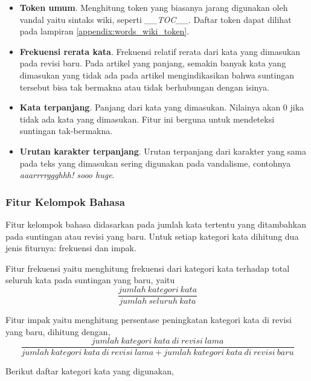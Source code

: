 \begin{itemize}
\item \textbf{Token umum}.
Menghitung token yang biasanya jarang digunakan oleh vandal yaitu sintaks
wiki, seperti \textit{\_\_TOC\_\_}. Daftar token dapat dilihat pada lampiran
\ref{appendix:words_wiki_token}.

\item \textbf{Frekuensi rerata kata}.
Frekuensi relatif rerata dari kata yang dimasukan pada revisi baru.
Pada artikel yang panjang, semakin banyak kata yang dimasukan yang tidak ada
pada artikel mengindikasikan bahwa suntingan tersebut bisa tak bermakna atau
tidak berhubungan dengan isinya.

\item \textbf{Kata terpanjang}.
Panjang dari kata yang dimasukan.
Nilainya akan 0 jika tidak ada kata yang dimasukan.
Fitur ini berguna untuk mendeteksi suntingan tak-bermakna.

\item \textbf{Urutan karakter terpanjang}.
Urutan terpanjang dari karakter yang sama pada teks yang dimasukan sering
digunakan pada vandalisme, contohnya \textit{aaarrrrggghhh! sooo huge}.

\end{itemize}

\subsubsection{Fitur Kelompok Bahasa}

Fitur kelompok bahasa didasarkan pada jumlah kata tertentu yang ditambahkan
pada suntingan atau revisi yang baru.
Untuk setiap kategori kata dihitung dua jenis fiturnya: frekuensi dan impak.

Fitur frekuensi yaitu menghitung frekuensi dari kategori kata terhadap
total seluruh kata pada suntingan yang baru, yaitu
\[
	\frac{jumlah\ kategori\ kata}
		{jumlah\ seluruh\ kata}
\]

Fitur impak yaitu menghitung persentase peningkatan kategori kata di revisi
yang baru, dihitung dengan,
\[
	\frac{jumlah\ kategori\ kata\ di\ revisi\ lama}
		{jumlah\ kategori\ kata\ di\ revisi\ lama +
		jumlah\ kategori\ kata\ di\ revisi\ baru}
\]

Berikut daftar kategori kata yang digunakan,

